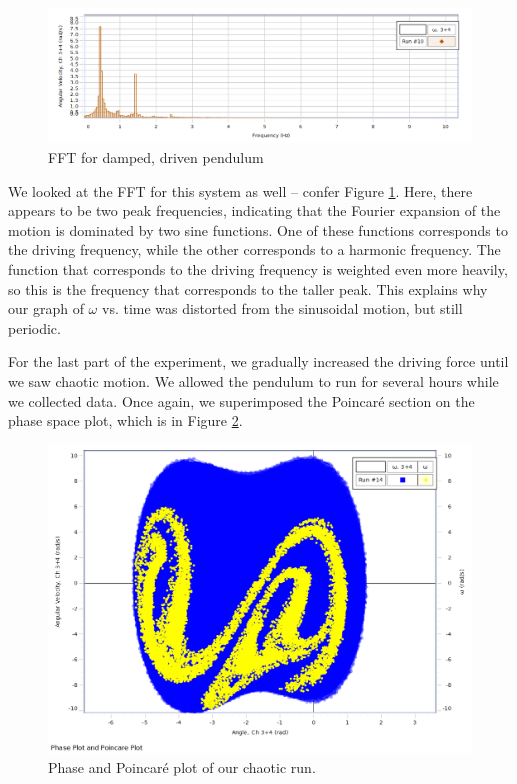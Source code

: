\documentclass[twocolumn,amsmath,amssymb,pra, floatfix]{revtex4-2}
\begin{document}
\begin{figure}[H]
    \centering
    \includegraphics[width = 0.7\linewidth]{images/NonChaoticFFT.PNG}
    \caption{FFT for damped, driven pendulum}
    \label{fig: FFT damped driven pendulum}
\end{figure}

We looked at the FFT for this system as well -- confer Figure \ref{fig: FFT damped driven pendulum}. Here, there appears to be two peak frequencies, indicating that the Fourier expansion of the motion is dominated by two sine functions. One of these functions corresponds to the driving frequency, while the other corresponds to a harmonic frequency. The function that corresponds to the driving frequency is weighted even more heavily, so this is the frequency that corresponds to the taller peak. This explains why our graph of $\omega$ vs. time was distorted from the sinusoidal motion, but still periodic.

For the last part of the experiment, we gradually increased the driving force until we saw chaotic motion. We allowed the pendulum to run for several hours while we collected data. Once again, we superimposed the Poincar\'{e} section on the phase space plot, which is in Figure \ref{fig: chaos poincare and phase plot}.

\begin{figure}[H]
    \centering
    \includegraphics[width = 0.7\linewidth]{images/ChaoticPlot3.PNG}
    \caption{Phase and Poincar\'{e} plot of our chaotic run.}
    \label{fig: chaos poincare and phase plot}
\end{figure}
\end{document}
